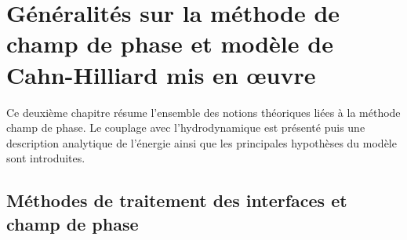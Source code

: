 \chapter{Généralités sur la méthode de champ de phase et modèle de Cahn-Hilliard mis en \oe uvre} \label{chap:2}
Ce deuxième chapitre résume l'ensemble des notions théoriques liées à la méthode champ de phase. Le couplage avec l'hydrodynamique est présenté puis une description analytique de l'énergie ainsi que les principales hypothèses du modèle sont introduites. 
\section{Méthodes de traitement des interfaces et champ de phase}

